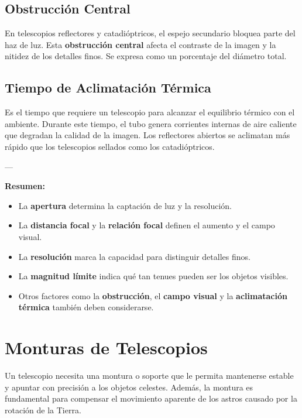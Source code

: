 \subsection{Obstrucción Central}

En telescopios reflectores y catadióptricos, el espejo secundario bloquea parte del haz de luz. Esta \textbf{obstrucción central} afecta el contraste de la imagen y la nitidez de los detalles finos. Se expresa como un porcentaje del diámetro total.

\subsection{Tiempo de Aclimatación Térmica}

Es el tiempo que requiere un telescopio para alcanzar el equilibrio térmico con el ambiente. Durante este tiempo, el tubo genera corrientes internas de aire caliente que degradan la calidad de la imagen. Los reflectores abiertos se aclimatan más rápido que los telescopios sellados como los catadióptricos.

---

\textbf{Resumen:}  
\begin{itemize}
	\item La \textbf{apertura} determina la captación de luz y la resolución.
	\item La \textbf{distancia focal} y la \textbf{relación focal} definen el aumento y el campo visual.
	\item La \textbf{resolución} marca la capacidad para distinguir detalles finos.
	\item La \textbf{magnitud límite} indica qué tan tenues pueden ser los objetos visibles.
	\item Otros factores como la \textbf{obstrucción}, el \textbf{campo visual} y la \textbf{aclimatación térmica} también deben considerarse.
\end{itemize}






\section{Monturas de Telescopios}
\label{sec:monturas_telescopios}

Un telescopio necesita una montura o soporte que le permita mantenerse estable y apuntar con precisión a los objetos celestes. Además, la montura es fundamental para compensar el movimiento aparente de los astros causado por la rotación de la Tierra.


